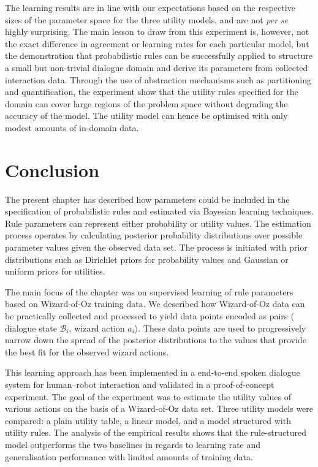The learning results are in line with our expectations based on the respective sizes of the parameter space for the three utility models, and are not \textit{per se} highly surprising.  The main lesson to draw from this experiment is, however, not the exact difference in agreement or learning rates for each particular model, but the demonstration that probabilistic rules can be successfully applied to structure a small but non-trivial dialogue domain and derive its parameters from collected interaction data.  Through the use of abstraction mechanisms such as partitioning and quantification, the experiment show that the utility rules specified for the domain can cover large regions of the problem space without degrading the accuracy of the model.  The utility model can hence be optimised with only modest amounts of in-domain data. 


\section{Conclusion}
\label{sec:woz-conclusions}

The present chapter has described how parameters could be included in the specification of probabilistic rules and estimated via Bayesian learning techniques.  Rule parameters can represent either probability or utility values. The estimation process operates by calculating posterior probability distributions over possible parameter values given the observed data set. The process is initiated with prior distributions such as Dirichlet priors for probability values and Gaussian or uniform priors for utilities. 

The main focus of the chapter was on supervised learning of rule parameters based on Wizard-of-Oz training data. We described how Wizard-of-Oz data can be practically collected and processed to yield data points encoded as pairs $\langle$dialogue state $\mathcal{B}_i$, wizard action $a_i\rangle$. These data points are used to progressively narrow down the spread of the posterior distributions to the values that provide the best fit for the observed wizard actions. 

This learning approach has been implemented in a end-to-end spoken dialogue system for human--robot interaction and validated in a proof-of-concept experiment.  The goal of the experiment was to estimate the utility values of various actions on the basis of a Wizard-of-Oz data set.  Three utility models were compared: a plain utility table, a linear model, and a model structured with utility rules. The analysis of the empirical results shows that the rule-structured model outperforms the two baselines in regards to learning rate and generalisation performance with limited amounts of training data.

